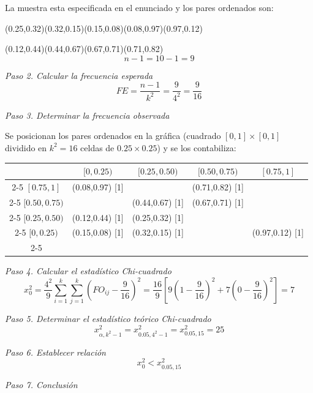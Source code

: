 \documentclass[11pt,letterpaper]{report}
\begin{document}
La muestra esta especificada en el enunciado y los pares ordenados son:

(0.25,0.32)(0.32,0.15)(0.15,0.08)(0.08,0.97)(0.97,0.12)

(0.12,0.44)(0.44,0.67)(0.67,0.71)(0.71,0.82)
\[
n - 1 = 10 - 1 = 9
\]

\textit{Paso 2. Calcular la frecuencia esperada}
\[
FE = \frac{n-1}{k^2} = \frac{9}{4^2} = \frac{9}{16}
\]

\textit{Paso 3. Determinar la frecuencia observada}

Se posicionan los pares ordenados en la gráfica (cuadrado $[0,1]\times[0,1]$ dividido en $k^2 = 16$ celdas de $0.25 \times 0.25$) y se los contabiliza:

\begin{table}[H]
\centering
\small
\begin{tabular}{c|c|c|c|c|}
\multicolumn{1}{c}{} & \multicolumn{1}{c}{$[0,0.25)$} & \multicolumn{1}{c}{$[0.25,0.50)$} & \multicolumn{1}{c}{$[0.50,0.75)$} & \multicolumn{1}{c}{$[0.75,1]$}\\
\cline{2-5}
$[0.75,1]$ & (0.08,0.97) [1] & & (0.71,0.82) [1] & \\
\cline{2-5}
$[0.50,0.75)$ & & (0.44,0.67) [1] & (0.67,0.71) [1] & \\
\cline{2-5}
$[0.25,0.50)$ & (0.12,0.44) [1] & (0.25,0.32) [1] & & \\
\cline{2-5}
$[0,0.25)$ & (0.15,0.08) [1] & (0.32,0.15) [1] & & (0.97,0.12) [1]\\
\cline{2-5}
\end{tabular}
\end{table}

\textit{Paso 4. Calcular el estadístico Chi-cuadrado}
\[
x_0^2 = \frac{4^2}{9}\sum_{i=1}^{k}\sum_{j=1}^{k}\left(FO_{ij} - \frac{9}{16}\right)^2 = \frac{16}{9}\left[9\left(1 - \frac{9}{16}\right)^2 + 7\left(0 - \frac{9}{16}\right)^2\right] = 7
\]

\textit{Paso 5. Determinar el estadístico teórico Chi-cuadrado}
\[
x_{\alpha,k^2-1}^2 = x_{0.05,4^2-1}^2 = x_{0.05,15}^2 = 25
\]

\begin{center}
\end{center}

\textit{Paso 6. Establecer relación}
\[
x_0^2 < x_{0.05,15}^2
\]

\textit{Paso 7. Conclusión}
\end{document}
